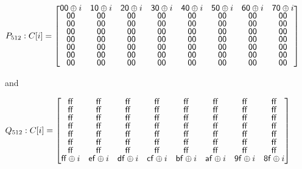 \begin{itemize}
    $ P_{512}: C[i] = \renewcommand\arraystretch{0.75}
    \begin{bmatrix}
      \mathsf{00} \oplus i & \mathsf{10} \oplus i & \mathsf{20} \oplus i & \mathsf{30} \oplus i & \mathsf{40} \oplus i & \mathsf{50} \oplus i & \mathsf{60} \oplus i & \mathsf{70} \oplus i \\
      \mathsf{00} & \mathsf{00} & \mathsf{00} & \mathsf{00} & \mathsf{00} & \mathsf{00} & \mathsf{00} & \mathsf{00} \\
      \mathsf{00} & \mathsf{00} & \mathsf{00} & \mathsf{00} & \mathsf{00} & \mathsf{00} & \mathsf{00} & \mathsf{00} \\
      \mathsf{00} & \mathsf{00} & \mathsf{00} & \mathsf{00} & \mathsf{00} & \mathsf{00} & \mathsf{00} & \mathsf{00} \\
      \mathsf{00} & \mathsf{00} & \mathsf{00} & \mathsf{00} & \mathsf{00} & \mathsf{00} & \mathsf{00} & \mathsf{00} \\
      \mathsf{00} & \mathsf{00} & \mathsf{00} & \mathsf{00} & \mathsf{00} & \mathsf{00} & \mathsf{00} & \mathsf{00} \\
      \mathsf{00} & \mathsf{00} & \mathsf{00} & \mathsf{00} & \mathsf{00} & \mathsf{00} & \mathsf{00} & \mathsf{00} \\
      \mathsf{00} & \mathsf{00} & \mathsf{00} & \mathsf{00} & \mathsf{00} & \mathsf{00} & \mathsf{00} & \mathsf{00} \\
    \end{bmatrix}$

    and 

    $Q_{512}: C[i] = \renewcommand\arraystretch{0.75}
    \begin{bmatrix}
      \mathsf{ff} & \mathsf{ff} & \mathsf{ff} & \mathsf{ff} & \mathsf{ff} & \mathsf{ff} & \mathsf{ff} & \mathsf{ff} \\
      \mathsf{ff} & \mathsf{ff} & \mathsf{ff} & \mathsf{ff} & \mathsf{ff} & \mathsf{ff} & \mathsf{ff} & \mathsf{ff} \\
      \mathsf{ff} & \mathsf{ff} & \mathsf{ff} & \mathsf{ff} & \mathsf{ff} & \mathsf{ff} & \mathsf{ff} & \mathsf{ff} \\
      \mathsf{ff} & \mathsf{ff} & \mathsf{ff} & \mathsf{ff} & \mathsf{ff} & \mathsf{ff} & \mathsf{ff} & \mathsf{ff} \\
      \mathsf{ff} & \mathsf{ff} & \mathsf{ff} & \mathsf{ff} & \mathsf{ff} & \mathsf{ff} & \mathsf{ff} & \mathsf{ff} \\
      \mathsf{ff} & \mathsf{ff} & \mathsf{ff} & \mathsf{ff} & \mathsf{ff} & \mathsf{ff} & \mathsf{ff} & \mathsf{ff} \\
      \mathsf{ff} & \mathsf{ff} & \mathsf{ff} & \mathsf{ff} & \mathsf{ff} & \mathsf{ff} & \mathsf{ff} & \mathsf{ff} \\
      \mathsf{ff} \oplus i & \mathsf{ef} \oplus i & \mathsf{df} \oplus i & \mathsf{cf} \oplus i & \mathsf{bf} \oplus i & \mathsf{af} \oplus i & \mathsf{9f} \oplus i & \mathsf{8f} \oplus i 
    \end{bmatrix}$


\end{itemize}
